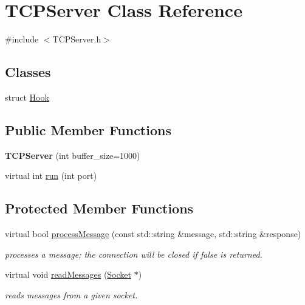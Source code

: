 \hypertarget{classTCPServer}{\section{T\-C\-P\-Server Class Reference}
\label{classTCPServer}
}


{\ttfamily \#include $<$T\-C\-P\-Server.\-h$>$}

\subsection*{Classes}
\begin{DoxyCompactItemize}
\item 
struct \hyperlink{structTCPServer_1_1Hook}{Hook}
\end{DoxyCompactItemize}
\subsection*{Public Member Functions}
\begin{DoxyCompactItemize}
\item 
\hypertarget{classTCPServer_a7a1cd88232db7a3551923ac4fafbad27}{{\bfseries T\-C\-P\-Server} (int buffer\-\_\-size=1000)}\label{classTCPServer_a7a1cd88232db7a3551923ac4fafbad27}

\item 
virtual int \hyperlink{classTCPServer_a1409041961e91f1dbc4933483b4c3b23}{run} (int port)
\end{DoxyCompactItemize}
\subsection*{Protected Member Functions}
\begin{DoxyCompactItemize}
\item 
virtual bool \hyperlink{classTCPServer_a707f8004c0fc8c50aafd12d187b853b9}{process\-Message} (const std\-::string \&message, std\-::string \&response)
\begin{DoxyCompactList}\small\item\em processes a message; the connection will be closed if false is returned. \end{DoxyCompactList}\item 
\hypertarget{classTCPServer_a5d1c3dced9ab7bdc5d5f13866f1eee79}{virtual void \hyperlink{classTCPServer_a5d1c3dced9ab7bdc5d5f13866f1eee79}{read\-Messages} (\hyperlink{classSocket}{Socket} $\ast$)}\label{classTCPServer_a5d1c3dced9ab7bdc5d5f13866f1eee79}

\begin{DoxyCompactList}\small\item\em reads messages from a given socket. \end{DoxyCompactList}\end{DoxyCompactItemize}
